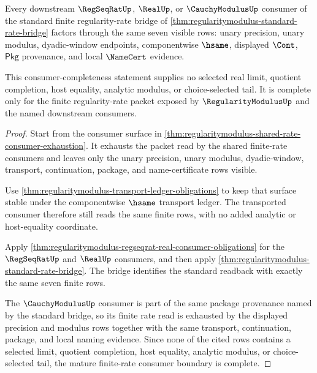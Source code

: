 \begin{theorem}
\label{thm:regularitymodulus-mature-rate-consumer-completeness}
Every downstream $\RegSeqRatUp$, $\RealUp$, or $\CauchyModulusUp$ consumer of the
standard finite regularity-rate bridge of
\autoref{thm:regularitymodulus-standard-rate-bridge} factors through the same
seven visible rows: unary precision, unary modulus, dyadic-window endpoints,
componentwise $\hsame$, displayed $\Cont$, $\mathsf{Pkg}$ provenance, and local
$\NameCert$ evidence.

This consumer-completeness statement supplies no selected real limit, quotient
completion, host equality, analytic modulus, or choice-selected tail. It is
complete only for the finite regularity-rate packet exposed by
$\RegularityModulusUp$ and the named downstream consumers.
\end{theorem}
\begin{proof}
Start from the consumer surface in
\autoref{thm:regularitymodulus-shared-rate-consumer-exhaustion}. It exhausts
the packet read by the shared finite-rate consumers and leaves only the unary
precision, unary modulus, dyadic-window, transport, continuation, package, and
name-certificate rows visible.

Use \autoref{thm:regularitymodulus-transport-ledger-obligations} to keep that
surface stable under the componentwise $\hsame$ transport ledger. The transported
consumer therefore still reads the same finite rows, with no added analytic or
host-equality coordinate.

Apply \autoref{thm:regularitymodulus-regseqrat-real-consumer-obligations} for
the $\RegSeqRatUp$ and $\RealUp$ consumers, and then apply
\autoref{thm:regularitymodulus-standard-rate-bridge}. The bridge identifies the
standard readback with exactly the same seven finite rows.

The $\CauchyModulusUp$ consumer is part of the same package provenance named by
the standard bridge, so its finite rate read is exhausted by the displayed
precision and modulus rows together with the same transport, continuation,
package, and local naming evidence. Since none of the cited rows contains a
selected limit, quotient completion, host equality, analytic modulus, or
choice-selected tail, the mature finite-rate consumer boundary is complete.
\end{proof}

